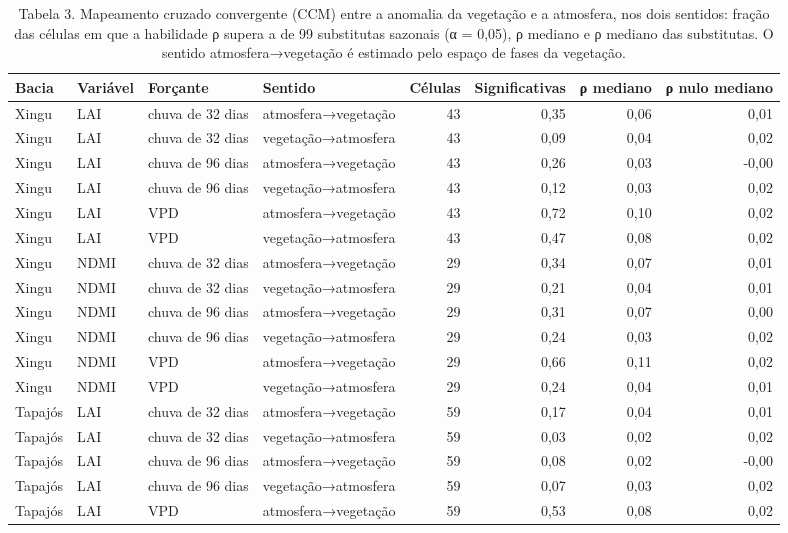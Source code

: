 \begin{table}
\caption{Tabela 3. Mapeamento cruzado convergente (CCM) entre a anomalia da vegetação e a atmosfera, nos dois sentidos: fração das células em que a habilidade ρ supera a de 99 substitutas sazonais (α = 0,05), ρ mediano e ρ mediano das substitutas. O sentido atmosfera→vegetação é estimado pelo espaço de fases da vegetação.}
\label{tab:12_floresta_atmosfera::ccm}
\begin{tabular}{llllrrrr}
\toprule
Bacia & Variável & Forçante & Sentido & Células & Significativas & ρ mediano & ρ nulo mediano \\
\midrule
Xingu & LAI & chuva de 32 dias & atmosfera→vegetação & 43 & 0,35 & 0,06 & 0,01 \\
Xingu & LAI & chuva de 32 dias & vegetação→atmosfera & 43 & 0,09 & 0,04 & 0,02 \\
Xingu & LAI & chuva de 96 dias & atmosfera→vegetação & 43 & 0,26 & 0,03 & -0,00 \\
Xingu & LAI & chuva de 96 dias & vegetação→atmosfera & 43 & 0,12 & 0,03 & 0,02 \\
Xingu & LAI & VPD & atmosfera→vegetação & 43 & 0,72 & 0,10 & 0,02 \\
Xingu & LAI & VPD & vegetação→atmosfera & 43 & 0,47 & 0,08 & 0,02 \\
Xingu & NDMI & chuva de 32 dias & atmosfera→vegetação & 29 & 0,34 & 0,07 & 0,01 \\
Xingu & NDMI & chuva de 32 dias & vegetação→atmosfera & 29 & 0,21 & 0,04 & 0,01 \\
Xingu & NDMI & chuva de 96 dias & atmosfera→vegetação & 29 & 0,31 & 0,07 & 0,00 \\
Xingu & NDMI & chuva de 96 dias & vegetação→atmosfera & 29 & 0,24 & 0,03 & 0,02 \\
Xingu & NDMI & VPD & atmosfera→vegetação & 29 & 0,66 & 0,11 & 0,02 \\
Xingu & NDMI & VPD & vegetação→atmosfera & 29 & 0,24 & 0,04 & 0,01 \\
Tapajós & LAI & chuva de 32 dias & atmosfera→vegetação & 59 & 0,17 & 0,04 & 0,01 \\
Tapajós & LAI & chuva de 32 dias & vegetação→atmosfera & 59 & 0,03 & 0,02 & 0,02 \\
Tapajós & LAI & chuva de 96 dias & atmosfera→vegetação & 59 & 0,08 & 0,02 & -0,00 \\
Tapajós & LAI & chuva de 96 dias & vegetação→atmosfera & 59 & 0,07 & 0,03 & 0,02 \\
Tapajós & LAI & VPD & atmosfera→vegetação & 59 & 0,53 & 0,08 & 0,02 \\

\end{tabular}
\end{table}
